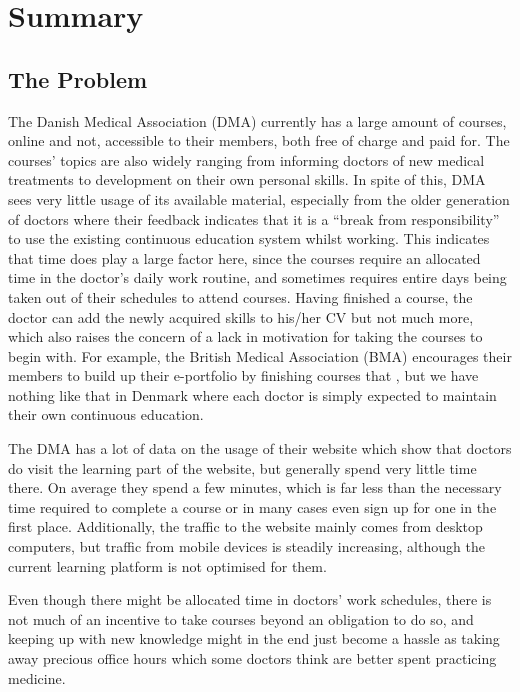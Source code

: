 \section{Summary}

\subsection{The Problem}
The Danish Medical Association (DMA) currently has a large amount of courses, online and not, accessible to their members, both free of charge and paid for. The courses’ topics are also widely ranging from informing doctors of new medical treatments to development on their own personal skills. In spite of this, DMA sees very little usage of its available material, especially from the older generation of doctors where their feedback indicates that it is a “break from responsibility” to use the existing continuous education system whilst working. This indicates that time does play a large factor here, since the courses require an allocated time in the doctor’s daily work routine, and sometimes requires entire days being taken out of their schedules to attend courses. Having finished a course, the doctor can add the newly acquired skills to his/her CV but not much more, which also raises the concern of a lack in motivation for taking the courses to begin with. For example, the British Medical Association (BMA) encourages their members to build up their e-portfolio by finishing courses that , but we have nothing like that in Denmark where each doctor is simply expected to maintain their own continuous education.

The DMA has a lot of data on the usage of their website which show that doctors do visit the learning part of the website, but generally spend very little time there. On average they spend a few minutes, which is far less than the necessary time required to complete a course or in many cases even sign up for one in the first place. Additionally, the traffic to the website mainly comes from desktop computers, but traffic from mobile devices is steadily increasing, although the current learning platform is not optimised for them.

Even though there might be allocated time in doctors’ work schedules, there is not much of an incentive to take courses beyond an obligation to do so, and keeping up with new knowledge might in the end just become a hassle as taking away precious office hours which some doctors think are better spent practicing medicine.

